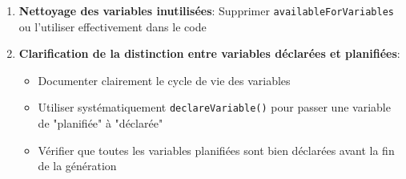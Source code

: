 \documentclass[11pt,a4paper]{article}
\begin{document}
\begin{enumerate}
    \item \textbf{Nettoyage des variables inutilisées}: Supprimer \texttt{availableForVariables} ou l'utiliser effectivement dans le code
    
    \item \textbf{Clarification de la distinction entre variables déclarées et planifiées}:
    \begin{itemize}
        \item Documenter clairement le cycle de vie des variables
        \item Utiliser systématiquement \texttt{declareVariable()} pour passer une variable de "planifiée" à "déclarée"
        \item Vérifier que toutes les variables planifiées sont bien déclarées avant la fin de la génération
    \end{itemize}
\end{enumerate}
\end{document}

